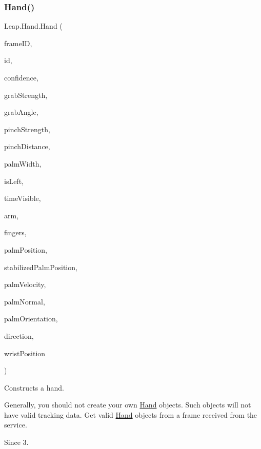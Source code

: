 \subsubsection{\texorpdfstring{Hand()}{Hand()}\hspace{0.1cm}{\footnotesize\ttfamily [2/2]}}
{\footnotesize\ttfamily Leap.\+Hand.\+Hand (\begin{DoxyParamCaption}\item[{long}]{frame\+ID,  }\item[{int}]{id,  }\item[{float}]{confidence,  }\item[{float}]{grab\+Strength,  }\item[{float}]{grab\+Angle,  }\item[{float}]{pinch\+Strength,  }\item[{float}]{pinch\+Distance,  }\item[{float}]{palm\+Width,  }\item[{bool}]{is\+Left,  }\item[{float}]{time\+Visible,  }\item[{\mbox{\hyperlink{class_leap_1_1_arm}{Arm}}}]{arm,  }\item[{List$<$ \mbox{\hyperlink{class_leap_1_1_finger}{Finger}} $>$}]{fingers,  }\item[{\mbox{\hyperlink{struct_leap_1_1_vector}{Vector}}}]{palm\+Position,  }\item[{\mbox{\hyperlink{struct_leap_1_1_vector}{Vector}}}]{stabilized\+Palm\+Position,  }\item[{\mbox{\hyperlink{struct_leap_1_1_vector}{Vector}}}]{palm\+Velocity,  }\item[{\mbox{\hyperlink{struct_leap_1_1_vector}{Vector}}}]{palm\+Normal,  }\item[{\mbox{\hyperlink{struct_leap_1_1_leap_quaternion}{Leap\+Quaternion}}}]{palm\+Orientation,  }\item[{\mbox{\hyperlink{struct_leap_1_1_vector}{Vector}}}]{direction,  }\item[{\mbox{\hyperlink{struct_leap_1_1_vector}{Vector}}}]{wrist\+Position }\end{DoxyParamCaption})}



Constructs a hand. 

Generally, you should not create your own \mbox{\hyperlink{class_leap_1_1_hand}{Hand}} objects. Such objects will not have valid tracking data. Get valid \mbox{\hyperlink{class_leap_1_1_hand}{Hand}} objects from a frame received from the service. \begin{DoxySince}{Since}
3. 
\end{DoxySince}


